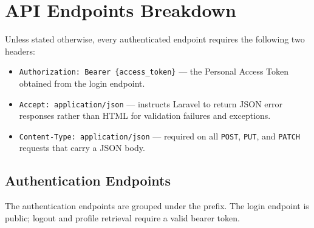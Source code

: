 \chapter{API Endpoints Breakdown}
\label{chap:endpoints}


\begin{notebox}
  Unless stated otherwise, every authenticated endpoint requires the
  following two headers:
  \begin{itemize}
    \item \texttt{Authorization: Bearer \{access\_token\}} --- the
      Personal Access Token obtained from the login endpoint.
    \item \texttt{Accept: application/json} --- instructs Laravel to
      return JSON error responses rather than HTML for validation
      failures and exceptions.
    \item \texttt{Content-Type: application/json} --- required on all
      \texttt{POST}, \texttt{PUT}, and \texttt{PATCH} requests that
      carry a JSON body.
  \end{itemize}
\end{notebox}

\section{Authentication Endpoints}
\label{sec:ep-auth}

The authentication endpoints are grouped under the
 prefix. The login endpoint is public; logout and
profile retrieval require a valid bearer token.

